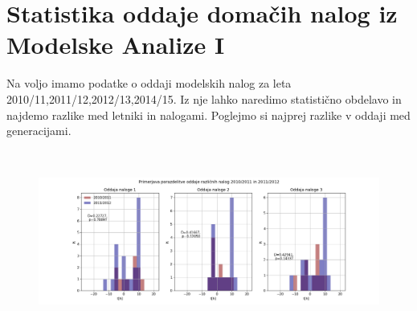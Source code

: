 \documentclass[11pt, a4paper]{article}
\begin{document}
\section{Statistika oddaje domačih nalog iz Modelske Analize I}
Na voljo imamo podatke o oddaji modelskih nalog za leta 2010/11,2011/12,2012/13,2014/15. Iz nje lahko naredimo statistično obdelavo in najdemo razlike med letniki in nalogami.
Poglejmo si najprej razlike v oddaji med generacijami. 
\begin{figure}[H]
\hspace*{-2.5cm}  
  \includegraphics[width=22cm,height=6cm]{tretja_primerjava1011.png}
\end{figure}
\end{document}
